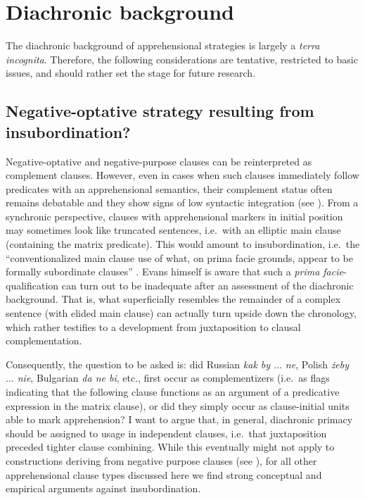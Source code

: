 \documentclass[output=paper,colorlinks,citecolor=brown]{langscibook}
\begin{document}
\section{Diachronic background}
\label{sec:diachronic}

The diachronic background of apprehensional strategies is largely a \textit{terra incognita}. Therefore, the following considerations are tentative, restricted to basic issues, and should rather set the stage for future research.


\subsection{Negative-optative strategy resulting from insubordination?}
\label{subsec:insubordination}

Negative-optative and negative-purpose clauses can be reinterpreted as complement clauses. However, even in cases when such clauses immediately follow predicates with an apprehensional semantics, their complement status often remains debatable and they show signs of low syntactic integration (see ). From a synchronic perspective, clauses with apprehensional markers in initial position may sometimes look like truncated sentences, i.e.\ with an elliptic main clause (containing the matrix predicate). This would amount to insubordination, i.e.\ the ``conventionalized main clause use of what, on prima facie grounds, appear to be formally subordinate clauses'' \citep[367]{evans2007insubordination}. Evans himself is aware that such a \textit{prima facie}-qualification can turn out to be inadequate after an assessment of the diachronic background. That is, what superficially resembles the remainder of a complex sentence (with elided main clause) can actually turn upside down the chronology, which rather testifies to a development from juxtaposition to clausal complementation.


Consequently, the question to be asked is: did Russian \textit{kak by $\ldots$  ne}, Polish \textit{żeby $\ldots$  nie}, Bulgarian \textit{da ne bi}, etc., first occur as complementizers (i.e.\ as flags indicating that the following clause functions as an argument of a predicative expression in the matrix clause), or did they simply occur as clause-initial units able to mark apprehension? I want to argue that, in general, diachronic primacy should be assigned to usage in independent clauses, i.e.\ that juxtaposition preceded tighter clause combining. While this eventually might not apply to constructions deriving from negative purpose clauses (see ), for all other apprehensional clause types discussed here we find strong conceptual and empirical arguments against insubordination.
\end{document}
